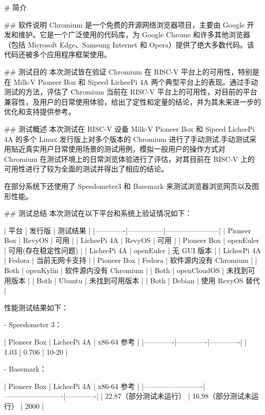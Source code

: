 \documentclass{article}
\begin{document}
\begin{markdown}

# 简介

## 软件说明
Chromium 是一个免费的开源网络浏览器项目，主要由 Google 开发和维护。它是一个广泛使用的代码库，为 Google Chrome 和许多其他浏览器（包括 Microsoft Edge、Samsung Internet 和 Opera）提供了绝大多数代码。该代码还被多个应用程序框架使用。

## 测试目的
本次测试皆在验证 Chromium 在 RISC-V 平台上的可用性，特别是在 Milk-V Pioneer Box 和 Sipeed LicheePi 4A 两个典型平台上的表现。通过手动测试的方法，评估了 Chromium 当前在 RISC-V 平台上的可用性，对目前的平台兼容性，及用户的日常使用体验，给出了定性和定量的结论，并为其未来进一步的优化和支持提供参考。

## 测试概述
本次测试在 RISC-V 设备 Milk-V Pioneer Box 和 Sipeed LicheePi 4A 的多个 Linux 发行版上对多个版本的 Chromium 进行了手动测试,手动测试采用贴近真实用户日常使用场景的测试用例，模拟一般用户的操作方式对 Chromium 在测试环境上的日常浏览体验进行了评估，对其目前在 RISC-V 上的可用性进行了较为全面的测试并得出了相应的结论。

在部分系统下还使用了 Speedometer3 和 Basemark 来测试浏览器浏览网页以及图形性能。

## 测试总结
本次测试在以下平台和系统上验证情况如下：

| 平台        | 发行版        | 测试结果              |
|-------------|---------------|-----------------------|
| Pioneer Box | RevyOS        | 可用                  |
| LicheePi 4A | RevyOS        | 可用                  |
| Pioneer Box | openEuler     | 可用(存在稳定性问题)   |
| LicheePi 4A | openEuler     | 无 GUI 版本           |
| LicheePi 4A | Fedora        | 当前无网卡支持        |
| Pioneer Box | Fedora        | 软件源内没有 Chromium |
| Both        | openKylin     | 软件源内没有 Chromium |
| Both        | openCloudOS   | 未找到可用版本        |
| Both        | Ubuntu        | 未找到可用版本        |
| Both        | Debian | 使用 RevyOS 替代      |


性能测试结果如下：

- Speedometer 3：

| Pioneer Box | LicheePi 4A | x86-64 参考 |
|-------------|-------------|-------------|
|    1.03     | 0.706       | 10-20       |

- Basemark：

| Pioneer Box             | LicheePi 4A             | x86-64 参考 |
|-------------------------|-------------------------|-------------|
| 22.87（部分测试未运行） | 16.98（部分测试未运行） | 2000        |


\end{markdown}
\end{document}
